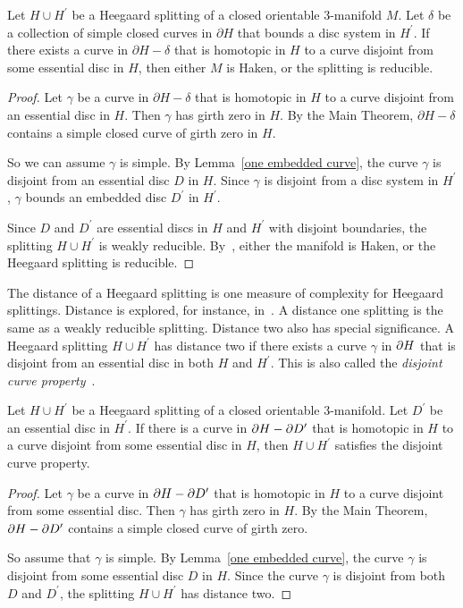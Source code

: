 \begin{corollary}
\label{cor 1}
Let $H\cup H^\prime$ be a Heegaard splitting of a closed orientable 
3-manifold $M$.
Let $\delta$ be a collection of simple closed curves in $\partial H$ 
that bounds a disc system in $H^\prime$.
If there exists a curve in $\partial H-\delta$ that is homotopic in 
$H$ to a curve disjoint from some essential disc in $H$, 
then either $M$ is Haken, or the splitting is reducible.
\end{corollary}

\begin{proof}
Let $\gamma$ be a curve in $\partial H-\delta$ that is
homotopic in $H$ to a curve disjoint from an essential disc in $H$.
Then $\gamma$ has girth zero in $H$.  By the Main Theorem,
$\partial H-\delta$ contains a simple closed curve of girth zero
in $H$.

So we can assume $\gamma$ is simple.  By 
Lemma~\ref{one embedded curve}, the curve $\gamma$ is disjoint from 
an essential disc $D$ in $H$.
Since $\gamma$ is disjoint from a disc system in $H^\prime$,
$\gamma$ bounds an embedded disc $D^\prime$ in $H^\prime$.

Since $D$ and $D^\prime$ are essential discs in $H$ and $H^\prime$
with disjoint boundaries, the splitting $H\cup H^\prime$ 
is weakly reducible.  By~\cite{CG}, either 
the manifold is Haken, or the Heegaard splitting is reducible.
\end{proof}

The distance of a Heegaard splitting is one measure of 
complexity for Heegaard splittings.  Distance is explored,
for instance, in~\cite{He2}.
A distance one splitting is the same as a weakly reducible splitting.
Distance two also has special significance.
A Heegaard splitting $H\cup H^\prime$ has distance two if 
there exists a curve $\gamma$ in $\partial H$ that is disjoint from an 
essential disc in both $H$ and $H^\prime$.
This is also called the 
\emph{disjoint curve property}~\cite{Tho}.
 
\begin{corollary}
Let $H\cup H^\prime$ be a Heegaard splitting of a closed orientable 
3-manifold.
Let $D^\prime$ be an essential disc in $H^\prime$.
If there is a curve in $\partial H-\partial D^\prime$ that is homotopic 
in $H$ to a curve disjoint from some essential disc in $H$, then 
$H\cup H^\prime$ satisfies the disjoint curve property.
\end{corollary}

\begin{proof}
Let $\gamma$ be a curve in $\partial H-\partial D^\prime$ that is
homotopic in $H$ to a curve disjoint from some essential disc.
Then $\gamma$ has girth zero in $H$.  By the Main Theorem,
$\partial H-\partial D^\prime$ contains a simple closed curve of girth zero.

So assume that $\gamma$ is simple.
By Lemma~\ref{one embedded curve}, the curve $\gamma$ is disjoint 
from some essential disc $D$ in $H$.
Since the curve $\gamma$ is disjoint from both $D$ and $D^\prime$,
the splitting $H\cup H^\prime$ has distance two.
\end{proof}

